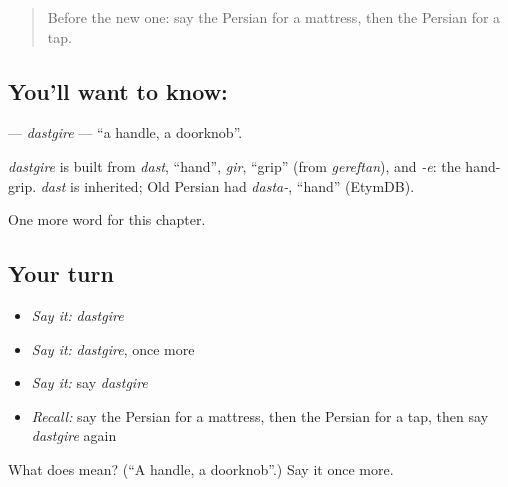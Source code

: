 \label{lesson:FA-C282-dastgire}



\begin{quote}
Before the new one: say the Persian for a mattress, then the Persian for a tap.
\end{quote}

\subsection*{You'll want to know: }
\textbf{} — \emph{dastgire} — \textquotedblleft{}a handle, a doorknob\textquotedblright{}.

\begin{cousinweb}
\emph{dastgire} is built from \emph{dast}, \textquotedblleft{}hand\textquotedblright{}, \emph{gir}, \textquotedblleft{}grip\textquotedblright{} (from \emph{gereftan}), and \emph{-e}: the hand-grip. \emph{dast} is inherited; Old Persian had \emph{dasta-}, \textquotedblleft{}hand\textquotedblright{} (EtymDB).
\end{cousinweb}

\begin{grammarlens}[title={What you've built}]
One more word for this chapter.
\end{grammarlens}

\subsection*{Your turn}
\begin{itemize}
\raggedright
  \item \emph{Say it:} \emph{dastgire}
  \item \emph{Say it:} \emph{dastgire}, once more
  \item \emph{Say it:} say \emph{dastgire}
  \item \emph{Recall:} say the Persian for a mattress, then the Persian for a tap, then say \emph{dastgire} again
\end{itemize}

\begin{tcolorbox}[breakable,colback=teal!4,colframe=teal!35!black,title={Before you move on}]
What does  mean? (\textquotedblleft{}A handle, a doorknob\textquotedblright{}.) Say it once more.
\end{tcolorbox}
